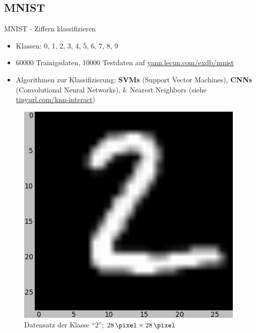 \documentclass{beamer}
\begin{document}
\subsection{MNIST}
\begin{frame}{MNIST - Ziffern klassifizieren}
    \begin{minipage}[b]{0.45\linewidth}
        \begin{itemize}
            \item Klassen: 0, 1, 2, 3, 4, 5, 6, 7, 8, 9
            \item \num{60000} Trainigsdaten, \num{10000} Testdaten
                  auf \href{http://yann.lecun.com/exdb/mnist/}{yann.lecun.com/exdb/mnist}
            \item Algorithmen zur Klassifizierung: \textbf{SVMs} (Support Vector Machines),
                  \textbf{CNNs} (Convolutional Neural Networks),
                  $k$~Nearest Neighbors (siehe \href{http://martin-thoma.com/k-nearest-neighbor-classification-interactive-example/}{tinyurl.com/knn-interact})
        \end{itemize}
    \end{minipage}
    \hspace{0.5cm}
    \begin{minipage}[b]{0.45\linewidth}
        \begin{figure}
            \centering
            \includegraphics[width=\textwidth]{../images/mnist-2.png}
            \caption{Datensatz der Klasse \enquote{2}; $\SI{28}{\pixel} \times \SI{28}{\pixel}$}
            \label{fig:spline}
        \end{figure}
    \end{minipage}
\end{frame}
\end{document}
